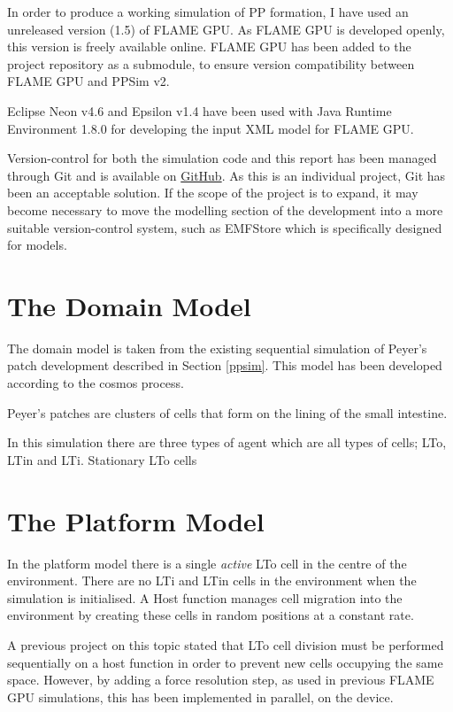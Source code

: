 \documentclass{UoYCSproject}
\begin{document}
In order to produce a working simulation of \gls{PP} formation, I have used an unreleased version (1.5) of \gls{FLAME GPU}.
As \gls{FLAME GPU} is developed openly, this version is freely available online\cite{flame_github}.
\gls{FLAME GPU} has been added to the project repository as a submodule, to ensure version compatibility between \gls{FLAME GPU} and PPSim v2.

Eclipse Neon v4.6 and Epsilon v1.4 have been used with Java Runtime Environment 1.8.0 for developing the input XML model for \gls{FLAME GPU}.

Version-control for both the simulation code and this report has been managed through Git and is available on \href{https://github.com/oliver-binns/PRIY.git}{GitHub}. As this is an individual project, Git has been an acceptable solution. If the scope of the project is to expand, it may become necessary to move the modelling section of the development into a more suitable version-control system, such as EMFStore\cite{emf_store} which is specifically designed for models.

\section{The Domain Model}
The domain model is taken from the existing sequential simulation of Peyer's patch development described in Section \ref{ppsim}.
This model has been developed according to the \acrshort{cosmos} process\cite{cosmos}.

Peyer's patches are clusters of cells that form on the lining of the small intestine.

In this simulation there are three types of agent which are all types of cells; \gls{LTo}, \gls{LTin} and \gls{LTi}.
Stationary \gls{LTo} cells 

\section{The Platform Model}
In the platform model there is a single \textit{active} \gls{LTo} cell in the centre of the environment.
There are no LTi and LTin cells in the environment when the simulation is initialised.
A \gls{Host} function manages cell migration into the environment by creating these cells in random positions at a constant rate.

A previous project on this topic stated that LTo cell division must be performed sequentially on a host function in order to prevent new cells occupying the same space\cite{phil_diss}.
However, by adding a force resolution step, as used in previous \gls{FLAME GPU} simulations\cite{flame_keratinocyte}, this has been implemented in parallel, on the device.
\end{document}
